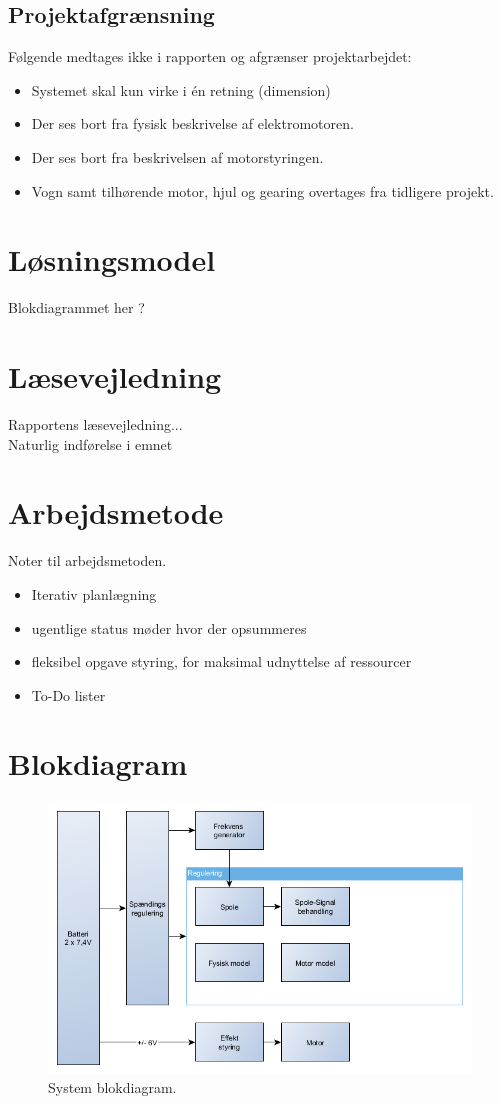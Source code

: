 \subsection{Projektafgrænsning}
Følgende medtages ikke i rapporten og afgrænser projektarbejdet:
\begin{itemize}
\item Systemet skal kun virke i én retning (dimension)
\item Der ses bort fra fysisk beskrivelse af elektromotoren.
\item Der ses bort fra beskrivelsen af motorstyringen.
\item Vogn samt tilhørende motor, hjul og gearing overtages fra tidligere projekt.
\end{itemize}

\section{Løsningsmodel}
Blokdiagrammet her ?

\section{Læsevejledning}
Rapportens læsevejledning...\\
Naturlig indførelse i emnet

\section{Arbejdsmetode}
Noter til arbejdsmetoden.
\begin{itemize}
	\item Iterativ planlægning
	\item ugentlige status møder hvor der opsummeres
	\item fleksibel opgave styring, for maksimal udnyttelse af ressourcer 
	\item To-Do lister
\end{itemize}

\section{Blokdiagram}
\begin{figure}[h!]
	\centering
	\includegraphics[width=.9\textwidth]{diagram/blokdiagram1.png}
	\caption{System blokdiagram.}
	\label{fig:blockdiagram1}
\end{figure}
\FloatBlock




